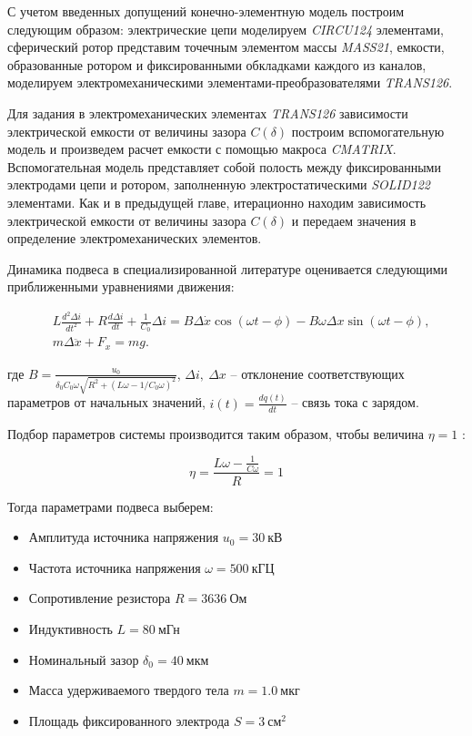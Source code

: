 С учетом введенных допущений конечно-элементную модель построим следующим образом: электрические цепи моделируем \textit{CIRCU124} элементами, сферический ротор представим точечным элементом массы \textit{MASS21}, емкости, образованные ротором и фиксированными обкладками каждого из каналов, моделируем электромеханическими элементами-преобразователями \textit{TRANS126}.

Для задания в электромеханических элементах \textit{TRANS126} зависимости электрической емкости от величины зазора $C(\delta)$ построим вспомогательную модель и произведем расчет емкости с помощью макроса \textit{CMATRIX}. Вспомогательная модель представляет собой полость между фиксированными электродами цепи и ротором, заполненную электростатическими \textit{SOLID122} элементами. Как и в предыдущей главе, итерационно находим зависимость электрической емкости от величины зазора $C(\delta)$ и передаем значения в определение электромеханических элементов.

Динамика подвеса в специализированной литературе \cite{Electropribor} оценивается следующими приближенными уравнениями движения:

\begin{equation}
  \label{eq:sphere_susp_motion}
    \begin{alignedat}{2}
    &L \frac{d^2 \Delta i}{dt^2} + R \frac{d \Delta i}{dt} + \frac{1}{C_0} \Delta i = B \Delta \dot x \cos{(\omega t - \phi)} - B \omega \Delta x \sin{(\omega t - \phi)}, \\
    &m \Delta \ddot x + F_x = mg.
    \end{alignedat}
\end{equation}


\noindent где $B = \frac{u_0}{ \delta_0 C_0 \omega \sqrt{R^2 + (L \omega -1/C_0 \omega)^2} }$, $\Delta i,\ \Delta x$ – отклонение соответствующих параметров от начальных значений, $i(t) = \frac{dq(t)}{dt}$ – связь тока с зарядом. 

Подбор параметров системы производится таким образом, чтобы величина $\eta = 1$ \cite{Electropribor}:

\[
\eta = \frac{L\omega - \frac{1}{C\omega}}{R} = 1
\]

Тогда параметрами подвеса выберем:
\begin{itemize}
  \item Амплитуда источника напряжения $u_0 = 30\ \text{кВ}$
  \item Частота источника напряжения $\omega = 500\ \text{кГЦ}$
  \item Сопротивление резистора $R = 3636\ \text{Ом}$
  \item Индуктивность $L = 80\ \text{мГн}$
  \item Номинальный зазор $\delta_0 = 40\ \text{мкм}$
  \item Масса удерживаемого твердого тела $m = 1.0\ \text{мкг}$
  \item Площадь фиксированного электрода $S = 3\ \text{см}^2$
\end{itemize}



